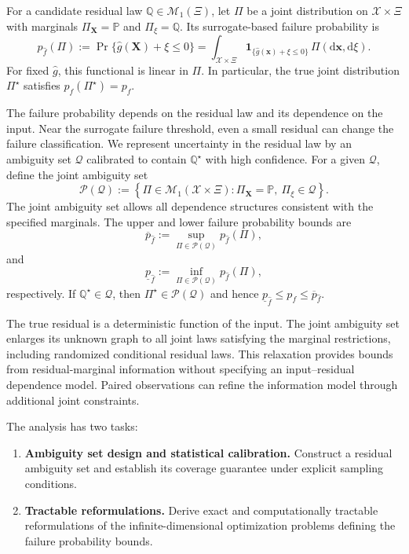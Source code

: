 \documentclass[review,11pt,3p,authoryear,nopreprintline]{elsarticle}
\begin{document}
For a candidate residual law $\mathbb Q\in\mathcal M_1(\Xi)$, let $\Pi$ be a joint distribution on $\mathcal X\times\Xi$ with marginals $\Pi_{\bm X}=\mathbb P$ and $\Pi_\xi=\mathbb Q$. Its surrogate-based failure probability is
\begin{equation}
  p_{\hat f}(\Pi):=\Pr\{\hat g(\bm X)+\xi\le0\}=\int_{\mathcal X\times\Xi}\mathbf 1_{\{\hat g(\bm x)+\xi\le0\}}\,\Pi(\mathrm d\bm x,\mathrm d\xi).
  \label{eq-surrogate-failure-probability}
\end{equation}
For fixed $\hat g$, this functional is linear in $\Pi$. In particular, the true joint distribution $\Pi^\star$ satisfies $p_{\hat f}(\Pi^\star)=p_f$.

The failure probability depends on the residual law and its dependence on the input. Near the surrogate failure threshold, even a small residual can change the failure classification. We represent uncertainty in the residual law by an ambiguity set $\mathcal Q$ calibrated to contain $\mathbb Q^\star$ with high confidence. For a given $\mathcal Q$, define the joint ambiguity set
\[
  \mathcal P(\mathcal Q) :=\left\{\Pi\in\mathcal M_1(\mathcal X\times\Xi):\Pi_{\bm X}=\mathbb P,\ \Pi_\xi\in\mathcal Q\right\}.
\]
The joint ambiguity set allows all dependence structures consistent with the specified marginals. The upper and lower failure probability bounds are
\begin{equation}
  \overline p_{\hat f}:=\sup_{\Pi\in\mathcal P(\mathcal Q)}p_{\hat f}(\Pi),
  \label{eq-upper-bound}
\end{equation}
and
\begin{equation}
  \underline p_{\hat f}:=\inf_{\Pi\in\mathcal P(\mathcal Q)}p_{\hat f}(\Pi),
  \label{eq-lower-bound}
\end{equation}
respectively. If $\mathbb Q^\star\in\mathcal Q$, then $\Pi^\star\in\mathcal P(\mathcal Q)$ and hence $\underline p_{\hat f}\le p_f\le\overline p_{\hat f}$.

The true residual is a deterministic function of the input. The joint ambiguity set enlarges its unknown graph to all joint laws satisfying the marginal restrictions, including randomized conditional residual laws. This relaxation provides bounds from residual-marginal information without specifying an input--residual dependence model. Paired observations can refine the information model through additional joint constraints.

The analysis has two tasks:
\begin{enumerate}
  \item \textbf{Ambiguity set design and statistical calibration.} Construct a residual ambiguity set and establish its coverage guarantee under explicit sampling conditions.
  \item \textbf{Tractable reformulations.} Derive exact and computationally tractable reformulations of the infinite-dimensional optimization problems defining the failure probability bounds.
\end{enumerate}
\end{document}
